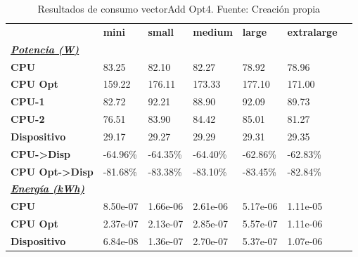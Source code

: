 \begin{table}[H]
    \centering
    \begin{tabular}{lllllll}
    \rowcolor[HTML]{DAE8FC} \ & \textbf{mini} & \textbf{small} & \textbf{medium} & \textbf{	large} & \textbf{	extralarge} \\
    \cellcolor[HTML]{DAE8FC} \textbf{\textbf{{\emph{{\underline{{Potencia (W)}}}}}}} &  &  &  & 	 & 	 \\
    \rowcolor[HTML]{EFEFEF} \cellcolor[HTML]{DAE8FC} \textbf{CPU} & 83.25 & 82.10 & 82.27 & 	78.92 & 	78.96 \\
    \cellcolor[HTML]{DAE8FC} \textbf{CPU Opt} & 159.22 & 176.11 & 173.33 & 	177.10 & 	171.00 \\
    \rowcolor[HTML]{EFEFEF} \cellcolor[HTML]{DAE8FC} \textbf{\quad CPU-1} & 82.72 & 92.21 & 88.90 & 	92.09 & 	89.73 \\
    \cellcolor[HTML]{DAE8FC} \textbf{\quad CPU-2} & 76.51 & 83.90 & 84.42 & 	85.01 & 	81.27 \\
    \rowcolor[HTML]{EFEFEF} \cellcolor[HTML]{DAE8FC} \textbf{Dispositivo} & 29.17 & 29.27 & 29.29 & 	29.31 & 	29.35 \\
    \cellcolor[HTML]{DAE8FC} \textbf{CPU->Disp} & -64.96\% & -64.35\% & -64.40\% & 	-62.86\% & 	-62.83\% \\
    \rowcolor[HTML]{EFEFEF} \cellcolor[HTML]{DAE8FC} \textbf{CPU Opt->Disp} & -81.68\% & -83.38\% & -83.10\% & 	-83.45\% & 	-82.84\% \\
    \cellcolor[HTML]{DAE8FC} \textbf{\textbf{{\emph{{\underline{{Energía (kWh)}}}}}}} &  &  &  & 	 & 	 \\
    \rowcolor[HTML]{EFEFEF} \cellcolor[HTML]{DAE8FC} \textbf{CPU} & 8.50e-07 & 1.66e-06 & 2.61e-06 & 	5.17e-06 & 	1.11e-05 \\
    \cellcolor[HTML]{DAE8FC} \textbf{CPU Opt} & 2.37e-07 & 2.13e-07 & 2.85e-07 & 	5.57e-07 & 	1.11e-06 \\
    \rowcolor[HTML]{EFEFEF} \cellcolor[HTML]{DAE8FC} \textbf{Dispositivo} & 6.84e-08 & 1.36e-07 & 2.70e-07 & 	5.37e-07 & 	1.07e-06 \\
    \end{tabular}
    \caption[Resultados de consumo vectorAdd Opt4]{{Resultados de consumo vectorAdd Opt4. Fuente: Creación propia}}
    \label{table_test_vectorAdd_Opt4_hw_powerResults}
\end{table}